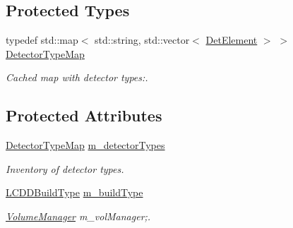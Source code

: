 \subsection*{Protected Types}
\begin{DoxyCompactItemize}
\item 
typedef std::map$<$ std::string, std::vector$<$ \hyperlink{class_d_d4hep_1_1_geometry_1_1_det_element}{DetElement} $>$ $>$ \hyperlink{class_d_d4hep_1_1_geometry_1_1_l_c_d_d_imp_af80f7fef6780569e2368b4c65bba3f58}{DetectorTypeMap}
\begin{DoxyCompactList}\small\item\em Cached map with detector types:. \item\end{DoxyCompactList}\end{DoxyCompactItemize}
\subsection*{Protected Attributes}
\begin{DoxyCompactItemize}
\item 
\hyperlink{class_d_d4hep_1_1_geometry_1_1_l_c_d_d_imp_af80f7fef6780569e2368b4c65bba3f58}{DetectorTypeMap} \hyperlink{class_d_d4hep_1_1_geometry_1_1_l_c_d_d_imp_ae90ce0f851d3887bb833a42fa34c6aea}{m\_\-detectorTypes}
\begin{DoxyCompactList}\small\item\em Inventory of detector types. \item\end{DoxyCompactList}\item 
\hyperlink{namespace_d_d4hep_acafe43ba4537ab6e999e808142965fab}{LCDDBuildType} \hyperlink{class_d_d4hep_1_1_geometry_1_1_l_c_d_d_imp_a5cd51ba18f6d2e7723acc93d9b7a90e4}{m\_\-buildType}
\begin{DoxyCompactList}\small\item\em \hyperlink{class_d_d4hep_1_1_geometry_1_1_volume_manager}{VolumeManager} m\_\-volManager;. \item\end{DoxyCompactList}\end{DoxyCompactItemize}
